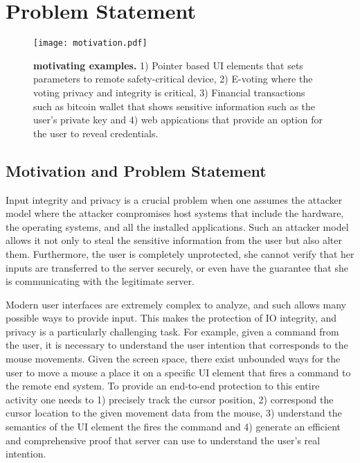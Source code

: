 \section{Problem Statement}
\label{sec:problemStatement}

\begin{figure}[t]
\centering
\texttt{[image: motivation.pdf]}
\caption{\textbf{\name motivating examples.} 1) Pointer based UI elements that sets parameters to remote safety-critical device, 2) E-voting where the voting privacy and integrity is critical, 3) Financial transactions such as bitcoin wallet that shows sensitive information such as the user's private key and 4) web appications that provide an option for the user to reveal credentials.}
\label{fig:motivation}
\centering
\end{figure}


\subsection{Motivation and Problem Statement}
Input integrity and privacy is a crucial problem when one assumes the attacker model where the attacker compromises host systems that include the hardware, the operating systems, and all the installed applications. Such an attacker model allows it not only to steal the sensitive information from the user but also alter them. Furthermore, the user is completely unprotected, she  cannot verify that her inputs are transferred to the server securely, or even have the guarantee that she is communicating with the legitimate server. 

Modern user interfaces are extremely complex to analyze, and such allows many possible ways to provide input. This makes the protection of IO integrity, and privacy is a particularly challenging task. For example, given a command from the user, it is necessary to understand the user intention that corresponds to the mouse movements. Given the screen space, there exist unbounded ways for the user to move a mouse a place it on a specific UI element that fires a command to the remote end system. To provide an end-to-end protection to this entire activity one needs to 1) precisely track the cursor position, 2) correspond the cursor location to the given movement data from the mouse, 3) understand the semantics of the UI element the fires the command and 4) generate an efficient and comprehensive proof that server can use to understand the user's real intention.  


